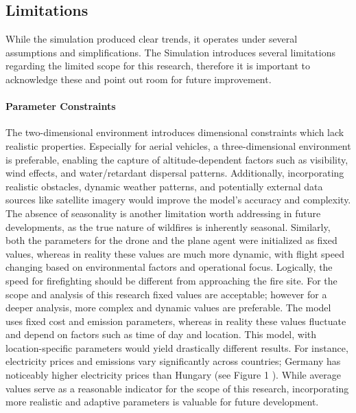 \documentclass[11pt, a4paper]{article}
\begin{document}
\subsection{Limitations}

While the simulation produced clear trends, it operates under several assumptions and simplifications. The Simulation introduces several limitations regarding the limited scope for this research, therefore it is important to acknowledge these and point out room for future improvement. 

\paragraph{Parameter Constraints} The two-dimensional environment introduces dimensional constraints which lack realistic properties. Especially for aerial vehicles, a three-dimensional environment is preferable, enabling the capture of altitude-dependent factors such as visibility, wind effects, and water/retardant dispersal patterns. 
Additionally, incorporating realistic obstacles, dynamic weather patterns, and potentially external data sources like satellite imagery would improve the model's accuracy and complexity. The absence of seasonality is another limitation worth addressing in future developments, as the true nature of wildfires is inherently seasonal.
Similarly, both the parameters for the drone and the plane agent were initialized as fixed values, whereas in reality these values are much more dynamic, with flight speed changing based on environmental factors and operational focus. Logically, the speed for firefighting should be different from approaching the fire site. For the scope and analysis of this research fixed values are acceptable; however for a deeper analysis, more complex and dynamic values are preferable.
The model uses fixed cost and emission parameters, whereas in reality these values fluctuate and depend on factors such as time of day and location. This model, with location-specific parameters would yield drastically different results. For instance, electricity prices and emissions vary significantly across countries; Germany has noticeably higher electricity prices than Hungary (see Figure 1 \citep{ElectricityPriceStatistics}). While average values serve as a reasonable indicator for the scope of this research, incorporating more realistic and adaptive parameters is valuable for future development.
\end{document}
